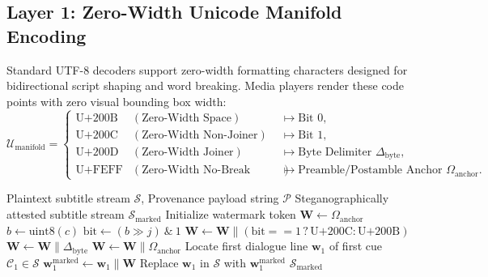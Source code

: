 \documentclass[11pt,a4paper,reqno]{article}
\theoremstyle{definition}
\theoremstyle{remark}
\begin{document}
\subsection{Layer 1: Zero-Width Unicode Manifold Encoding}
Standard UTF-8 decoders support zero-width formatting characters designed for bidirectional script shaping and word breaking. Media players render these code points with zero visual bounding box width:
\begin{equation}
\mathcal{U}_{\text{manifold}} = \left\{
\begin{array}{lll}
\text{U+200B} & (\text{Zero-Width Space}) & \mapsto \text{Bit } 0, \\
\text{U+200C} & (\text{Zero-Width Non-Joiner}) & \mapsto \text{Bit } 1, \\
\text{U+200D} & (\text{Zero-Width Joiner}) & \mapsto \text{Byte Delimiter } \Delta_{\text{byte}}, \\
\text{U+FEFF} & (\text{Zero-Width No-Break Space}) & \mapsto \text{Preamble/Postamble Anchor } \Omega_{\text{anchor}}.
\end{array}
\right.
\end{equation}

\begin{algorithm}[H]
\caption{Zero-Width Manifold Watermark Embedding}
\label{alg:zw_embed}
\begin{algorithmic}[1]
\Require Plaintext subtitle stream $\mathcal{S}$, Provenance payload string $\mathcal{P}$
\Ensure Steganographically attested subtitle stream $\mathcal{S}_{\text{marked}}$
\State Initialize watermark token $\mathbf{W} \gets \Omega_{\text{anchor}}$ 
    \State $b \gets \text{uint8}(c)$
        \State $\text{bit} \gets (b \gg j) \ \& \ 1$
        \State $\mathbf{W} \gets \mathbf{W} \parallel (\text{bit} == 1 \,?\, \text{U+200C} : \text{U+200B})$
    \EndFor
    \State $\mathbf{W} \gets \mathbf{W} \parallel \Delta_{\text{byte}}$ 
\EndFor
\State $\mathbf{W} \gets \mathbf{W} \parallel \Omega_{\text{anchor}}$ 
\State Locate first dialogue line $\mathbf{w}_1$ of first cue $\mathcal{C}_1 \in \mathcal{S}$
\State $\mathbf{w}_1^{\text{marked}} \gets \mathbf{w}_1 \parallel \mathbf{W}$
\State Replace $\mathbf{w}_1$ in $\mathcal{S}$ with $\mathbf{w}_1^{\text{marked}}$
\State \Return $\mathcal{S}_{\text{marked}}$
\end{algorithmic}
\end{algorithm}
\end{document}
